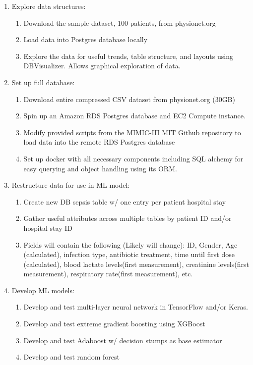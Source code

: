 \documentclass[11pt]{article}
\begin{document}
	\begin{enumerate}	
		
		\item Explore data structures:
		\begin{enumerate}
			\item Download the sample dataset, 100 patients, from physionet.org
			\item Load data into Postgres database locally
			\item Explore the data for useful trends, table structure, and layouts using DBVisualizer. Allows graphical exploration of data.
		\end{enumerate}
		
		\item Set up full database:
		
		\begin{enumerate}
			\item Download entire compressed CSV dataset from physionet.org (30GB)
			\item Spin up an Amazon RDS Postgres database and EC2 Compute instance.
			\item Modify provided scripts from the MIMIC-III MIT Github repository to load data into the remote RDS Postgres database
			\item Set up docker with all necessary components including SQL alchemy for easy querying and object handling using its ORM.
		\end{enumerate}
		
		\item Restructure data for use in ML model:
		
		\begin{enumerate}
			\item Create new DB sepsis table w/ one entry per patient hospital stay
			\item Gather useful attributes across multiple tables by patient ID and/or hospital stay ID
			\item Fields will contain the following (Likely will change): ID, Gender, Age (calculated), infection type, antibiotic treatment, time until first dose (calculated), blood lactate levels(first measurement), creatinine levels(first measurement), respiratory rate(first measurement), etc.
		\end{enumerate}
		
		
		\item Develop ML models:
		
		\begin{enumerate}
			\item Develop and test multi-layer neural network in TensorFlow and/or Keras.
			\item Develop and test extreme gradient boosting using XGBoost
			\item Develop and test Adaboost w/ decision stumps as base estimator
			\item Develop and test random forest
		\end{enumerate}
		

\end{enumerate}
\end{document}
